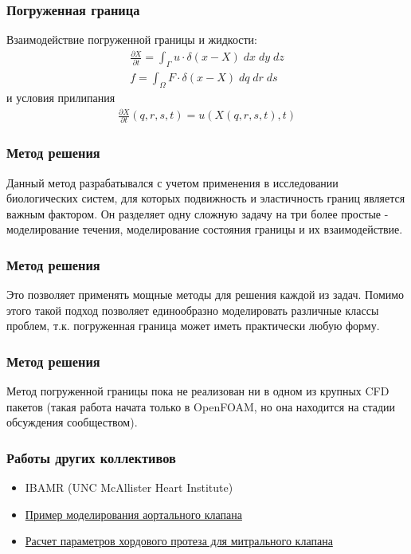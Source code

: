 \documentclass[14pt]{beamer}
\begin{document}
\begin{frame}
\frametitle{Погруженная граница}
Взаимодействие погруженной границы и жидкости:
\begin{gather}
    \label{eq:ibm_velocity}
    \frac{\partial X}{\partial t} = \int_{\Gamma} u \cdot \delta (x - X)\; dx\; dy\; dz \\
    \label{eq:ibm_force}
    f = \int_{\Omega} F \cdot \delta (x - X)\; dq\; dr\; ds
\end{gather}
и условия прилипания
\begin{gather}
    \label{eq:no_slip}
    \frac{\partial X}{\partial t} (q, r, s, t) = u(X(q, r, s, t), t)
\end{gather}
\end{frame}

\begin{frame}
\frametitle{Метод решения}
Данный метод разрабатывался с учетом применения в исследовании биологических систем, для которых подвижность и эластичность границ является важным фактором.
Он разделяет одну сложную задачу на три более простые - моделирование течения, моделирование состояния границы и их взаимодействие.
\end{frame}

\begin{frame}
\frametitle{Метод решения}
Это позволяет применять мощные методы для решения каждой из задач. Помимо этого такой подход позволяет единообразно моделировать различные классы проблем, т.к. погруженная граница может иметь практически любую форму.
\end{frame}

\begin{frame}
\frametitle{Метод решения}
Метод погруженной границы пока не реализован ни в одном из крупных CFD пакетов (такая работа начата только в OpenFOAM, но она находится на стадии обсуждения сообществом).
\end{frame}

\begin{frame}
\frametitle{Работы других коллективов}
\begin{itemize}
    \item IBAMR (UNC McAllister Heart Institute)
    \item \href{run:video/valve\_flow\_side.avi}{Пример моделирования аортального клапана}
    \item \href{run:video/MV\_side.avi}{Расчет параметров хордового протеза для митрального клапана}
\end{itemize}
\end{frame}
\end{document}
